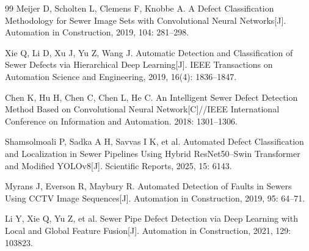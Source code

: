 \documentclass[UTF8,openany,12pt]{ctexbook}
\begin{document}
\begin{thebibliography}{99}
Meijer D, Scholten L, Clemens F, Knobbe A. A Defect Classification Methodology for Sewer Image Sets with Convolutional Neural Networks[J]. Automation in Construction, 2019, 104: 281--298.

Xie Q, Li D, Xu J, Yu Z, Wang J. Automatic Detection and Classification of Sewer Defects via Hierarchical Deep Learning[J]. IEEE Transactions on Automation Science and Engineering, 2019, 16(4): 1836--1847.

Chen K, Hu H, Chen C, Chen L, He C. An Intelligent Sewer Defect Detection Method Based on Convolutional Neural Network[C]//IEEE International Conference on Information and Automation. 2018: 1301--1306.

Shamsolmoali P, Sadka A H, Savvas I K, et al. Automated Defect Classification and Localization in Sewer Pipelines Using Hybrid ResNet50--Swin Transformer and Modified YOLOv8[J]. Scientific Reports, 2025, 15: 6143.

Myrans J, Everson R, Maybury R. Automated Detection of Faults in Sewers Using CCTV Image Sequences[J]. Automation in Construction, 2019, 95: 64--71.

Li Y, Xie Q, Yu Z, et al. Sewer Pipe Defect Detection via Deep Learning with Local and Global Feature Fusion[J]. Automation in Construction, 2021, 129: 103823.
\end{thebibliography}
\end{document}
